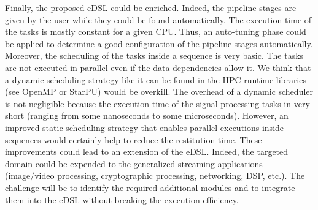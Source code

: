 Finally, the proposed eDSL could be enriched. Indeed, the pipeline stages are
given by the user while they could be found automatically. The execution time of
the tasks is mostly constant for a given CPU. Thus, an auto-tuning phase could
be applied to determine a good configuration of the pipeline stages
automatically. Moreover, the scheduling of the tasks inside a sequence is very
basic. The tasks are not executed in parallel even if the data dependencies
allow it. We think that a dynamic scheduling strategy like it can be found in
the HPC runtime libraries (see OpenMP or StarPU) would be overkill. The overhead
of a dynamic scheduler is not negligible because the execution time of the
signal processing tasks in very short (ranging from some nanoseconds to some
microseconds). However, an improved static scheduling strategy that enables
parallel executions inside sequences would certainly help to reduce the
restitution time. These improvements could lead to an extension of the \AFFECT
eDSL. Indeed, the targeted domain could be expended to the generalized streaming
applications (image/video processing, cryptographic processing, networking, DSP,
etc.). The challenge will be to identify the required additional modules and to
integrate them into the eDSL without breaking the execution efficiency.
